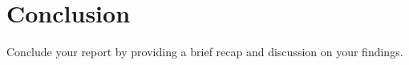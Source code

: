 \chapter{Conclusion} 
Conclude your report by providing a brief recap and discussion on your findings. 
